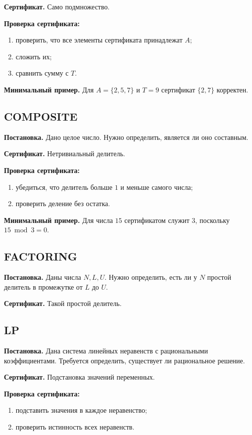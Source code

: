 \documentclass[12pt,a4paper]{article}
\theoremstyle{definition}
\theoremstyle{plain}
\begin{document}
\textbf{Сертификат.} Само подмножество.

\textbf{Проверка сертификата:}
\begin{enumerate}
\item проверить, что все элементы сертификата принадлежат $A$;
\item сложить их;
\item сравнить сумму с $T$.
\end{enumerate}

\textbf{Минимальный пример.}
Для $A=\{2,5,7\}$ и $T=9$ сертификат $\{2,7\}$ корректен.

\subsection{\textsc{COMPOSITE}}
\textbf{Постановка.} Дано целое число. Нужно определить, является ли оно составным.

\textbf{Сертификат.} Нетривиальный делитель.

\textbf{Проверка сертификата:}
\begin{enumerate}
\item убедиться, что делитель больше $1$ и меньше самого числа;
\item проверить деление без остатка.
\end{enumerate}

\textbf{Минимальный пример.}
Для числа $15$ сертификатом служит $3$, поскольку $15\bmod 3=0$.

\subsection{\textsc{FACTORING}}
\textbf{Постановка.} Даны числа $N,L,U$. Нужно определить, есть ли у $N$ простой делитель в промежутке от $L$ до $U$.

\textbf{Сертификат.} Такой простой делитель.

\subsection{\textsc{LP}}
\textbf{Постановка.} Дана система линейных неравенств с рациональными коэффициентами. Требуется определить, существует ли рациональное решение.

\textbf{Сертификат.} Подстановка значений переменных.

\textbf{Проверка сертификата:}
\begin{enumerate}
\item подставить значения в каждое неравенство;
\item проверить истинность всех неравенств.
\end{enumerate}
\end{document}
